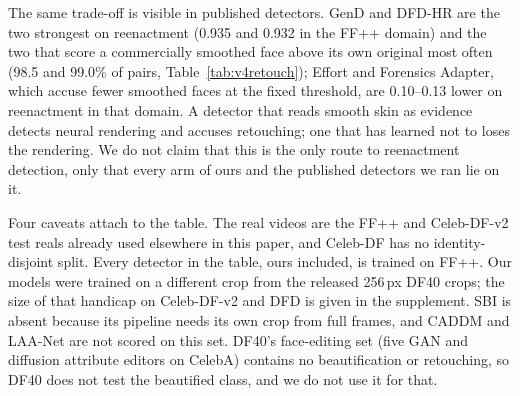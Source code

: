 The same trade-off is visible in published detectors. GenD and DFD-HR are the two strongest on reenactment (0.935 and
0.932 in the FF++ domain) and the two that score a commercially smoothed face above its own original most often
(98.5 and 99.0\% of pairs, Table~\ref{tab:v4retouch}); Effort and Forensics Adapter, which accuse fewer smoothed faces at
the fixed threshold, are 0.10--0.13 lower on reenactment in that domain. A detector that reads smooth skin as evidence detects
neural rendering and accuses retouching; one that has learned not to loses the rendering. We do not claim that this is
the only route to reenactment detection, only that every arm of ours and the published detectors we ran lie on it.

Four caveats attach to the table. The real videos are the FF++ and Celeb-DF-v2 test reals already used elsewhere in
this paper, and Celeb-DF has no identity-disjoint split. Every detector in the table, ours included, is trained on
FF++. Our models were trained on a different crop from the released 256\,px DF40 crops; the size of that handicap on
Celeb-DF-v2 and DFD is given in the supplement. SBI is absent because its pipeline needs its own crop from full
frames, and CADDM and LAA-Net are not scored on this set. DF40's face-editing set (five GAN and diffusion attribute
editors on CelebA) contains no beautification or retouching, so DF40 does not test the beautified class, and we do not
use it for that.
